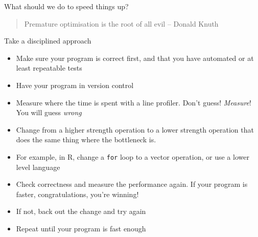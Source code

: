 \documentclass{beamer}
\begin{document}
\begin{frame}{What should we do to speed things up?}

	\begin{quote}
		Premature optimisation is the root of all evil -- Donald Knuth
	\end{quote}
		
	Take a disciplined approach

	\begin{itemize}

		\item Make sure your program is correct first, and that you have
		automated or at least repeatable tests

		\item Have your program in version control
		
		\item Measure where the time is spent with a line profiler. Don't guess! \emph{Measure}!
		You will guess \emph{wrong}
		
		\item Change from a higher strength operation to a lower strength
		operation that does the same thing where the bottleneck is.

		\item For example,
		in R, change a \texttt{for} loop to a vector operation, or use a lower
		level language
		
		\item Check correctness and measure the performance again. If your
		program is faster, congratulations, you're winning!
		
		\item If not, back out the change and try again
		
		\item Repeat until your program is fast enough
	\end{itemize}

\end{frame}
\end{document}
